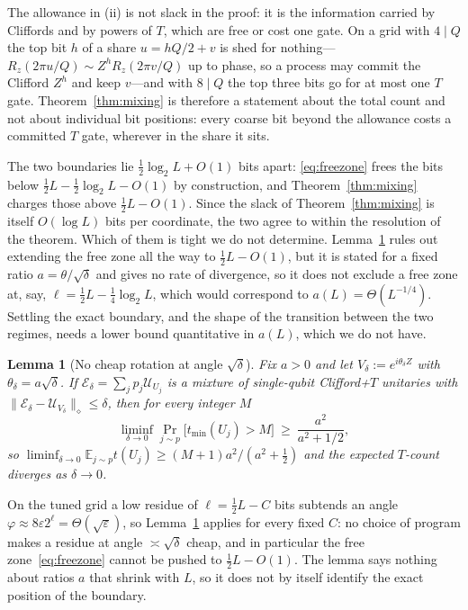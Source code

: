 \documentclass[aps,prx,twocolumn,superscriptaddress,nofootinbib,longbibliography]{revtex4-2}
\theoremstyle{plain}
\newtheorem{lemma}{Lemma}
\theoremstyle{definition}
\theoremstyle{remark}
\newcommand{\E}{\mathbb{E}}
\begin{document}
The allowance in (ii) is not slack in the proof: it is the information carried by Cliffords and by powers of $T$, which are free or cost one gate. On a grid with $4\mid Q$ the top bit $h$ of a share $u=hQ/2+v$ is shed for nothing---$R_z(2\pi u/Q)\sim Z^hR_z(2\pi v/Q)$ up to phase, so a process may commit the Clifford $Z^h$ and keep $v$---and with $8\mid Q$ the top three bits go for at most one $T$ gate. Theorem~\ref{thm:mixing} is therefore a statement about the total count and not about individual bit positions: every coarse bit beyond the allowance costs a committed $T$ gate, wherever in the share it sits.

The two boundaries lie $\tfrac12\log_2L+O(1)$ bits apart: \eqref{eq:freezone} frees the bits below $\tfrac12L-\tfrac12\log_2L-O(1)$ by construction, and Theorem~\ref{thm:mixing} charges those above $\tfrac12L-O(1)$. Since the slack of Theorem~\ref{thm:mixing} is itself $O(\log L)$ bits per coordinate, the two agree to within the resolution of the theorem. Which of them is tight we do not determine. Lemma~\ref{lem:nocheap} rules out extending the free zone all the way to $\tfrac12L-O(1)$, but it is stated for a fixed ratio $a=\theta/\sqrt\delta$ and gives no rate of divergence, so it does not exclude a free zone at, say, $\ell=\tfrac12L-\tfrac14\log_2L$, which would correspond to $a(L)=\Theta(L^{-1/4})$. Settling the exact boundary, and the shape of the transition between the two regimes, needs a lower bound quantitative in $a(L)$, which we do not have.

\begin{lemma}[No cheap rotation at angle $\sqrt\delta$]\label{lem:nocheap}
Fix $a>0$ and let $V_\delta:=e^{i\theta_\delta Z}$ with $\theta_\delta=a\sqrt\delta$. If $\mathcal E_\delta=\sum_jp_j\mathcal U_{U_j}$ is a mixture of single-qubit Clifford+$T$ unitaries with $\|\mathcal E_\delta-\mathcal U_{V_\delta}\|_\diamond\le\delta$, then for every integer $M$
\[
\liminf_{\delta\to0}\Pr_{j\sim p}\big[t_{\min}(U_j)>M\big]\ \ge\ \frac{a^2}{a^2+1/2},
\]
so $\liminf_{\delta\to0}\E_{j\sim p}t(U_j)\ge(M+1)a^2/(a^2+\tfrac12)$ and the expected $T$-count diverges as $\delta\to0$.
\end{lemma}
On the tuned grid a low residue of $\ell=\tfrac12L-C$ bits subtends an angle $\varphi\approx8\varepsilon2^\ell=\Theta(\sqrt\varepsilon)$, so Lemma~\ref{lem:nocheap} applies for every fixed $C$: no choice of program makes a residue at angle $\asymp\sqrt\delta$ cheap, and in particular the free zone~\eqref{eq:freezone} cannot be pushed to $\tfrac12L-O(1)$. The lemma says nothing about ratios $a$ that shrink with $L$, so it does not by itself identify the exact position of the boundary.
\end{document}

